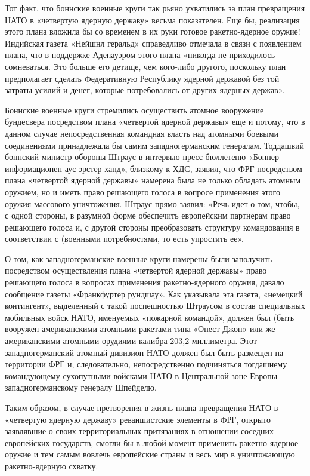 \documentclass[12pt, a4paper, openany]{book}
\begin{document}
	
	
	Тот факт, что боннские военные круги так рьяно ухватились за план превращения НАТО в «четвертую ядерную державу» весьма показателен. Еще бы, реализация этого плана вложила бы со временем в их руки готовое ракетно-ядерное оружие! Индийская газета «Нейшнл геральд» справедливо отмечала в связи с появлением плана, что в поддержке Аденауэром этого плана «никогда не приходилось сомневаться. Это больше его детище, чем кого-либо другого, поскольку план предполагает сделать Федеративную Республику ядерной державой без той затраты усилий и денег, которые потребовались от других ядерных держав».
	
	Боннские военные круги стремились осуществить атомное вооружение бундесвера посредством плана «четвертой ядерной державы» еще и потому, что в данном случае непосредственная командная власть над атомными боевыми соединениями принадлежала бы самим западногерманским генералам. Тоддашвий боннский министр обороны Штраус в интервью пресс-бюллетеню «Боннер информационен аус эрстер ханд», близкому к ХДС, заявил, что ФРГ посредством плана «четвертой ядерной державы» намерена была не только обладать атомным оружием, но и иметь право решающего голоса в вопросе применения этого оружия массового уничтожения. Штраус прямо заявил: «Речь идет о том, чтобы, с одной стороны, в разумной форме обеспечить европейским партнерам право решающего голоса и, с другой стороны преобразовать структуру командования в соответствии с (военными потребностями, то есть упростить ее».
	
	О том, как западногерманские военные круги намерены были заполучить посредством осуществления плана «четвертой ядерной державы» право решающего голоса в вопросах применения ракетно-ядерного оружия, давало сообщение газеты «Франкфуртер рундшау». Как указывала эта газета, «немецкий контингент», выделенный с такой поспешностью Штраусом в состав специальных мобильных войск НАТО, именуемых «пожарной командой», должен был (быть вооружен американскими атомными ракетами типа «Онест Джон» или же американскими атомными орудиями калибра 203,2 миллиметра. Этот западногерманский атомный дивизион НАТО должен был быть размещен на территории ФРГ и, следовательно, непосредственно подчиняться тогдашнему командующему сухопутными войсками НАТО в Центральной зоне Европы — западногерманскому генералу Шпейделю.
	
	Таким образом, в случае претворения в жизнь плана превращения НАТО в «четвертую ядерную державу» реваншистские элементы в ФРГ, открыто заявлявшие о своих территориальных притязаниях в отношении соседних европейских государств, смогли бы в любой момент применить ракетно-ядерное оружие и тем самым вовлечь европейские страны и весь мир в уничтожающую ракетно-ядерную схватку.
	
\end{document}
